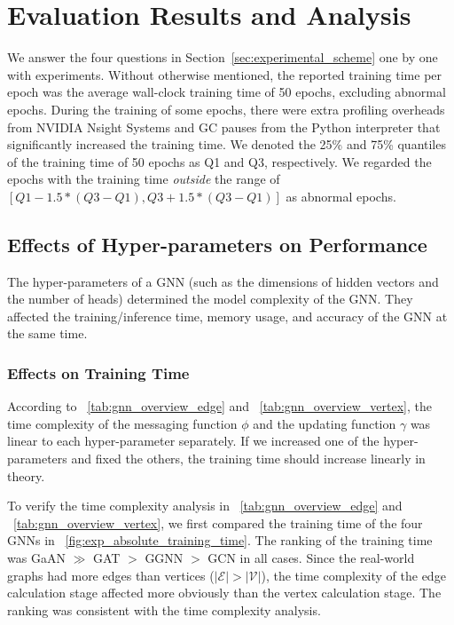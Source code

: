 \section{Evaluation Results and Analysis}
\label{sec:experiment_results}

We answer the four questions in Section~\ref{sec:experimental_scheme} one by one with experiments.
%
Without otherwise mentioned, the reported training time per epoch was the average wall-clock training time of 50 epochs, excluding abnormal epochs.
%
During the training of some epochs, there were extra profiling overheads from NVIDIA Nsight Systems and GC pauses from the Python interpreter that significantly increased the training time.
%
We denoted the 25\% and 75\% quantiles of the training time of 50 epochs as Q1 and Q3, respectively.
%
We regarded the epochs with the training time \emph{outside} the range of $[Q1 - 1.5 * (Q3-Q1), Q3 + 1.5 * (Q3-Q1)]$ as abnormal epochs.

\subsection{Effects of Hyper-parameters on Performance}
\label{sec:effects_of_hyper-parameters_on_performance}

The hyper-parameters of a GNN (such as the dimensions of hidden vectors and the number of heads) determined the model complexity of the GNN.
%
They affected the training/inference time, memory usage, and accuracy of the GNN at the same time.


\subsubsection{Effects on Training Time}

According to \tablename~\ref{tab:gnn_overview_edge} and \tablename~\ref{tab:gnn_overview_vertex}, the time complexity of the messaging function $\phi$ and the updating function $\gamma$ was linear to each hyper-parameter separately.
%
If we increased one of the hyper-parameters and fixed the others, the training time should increase linearly in theory.

To verify the time complexity analysis in \tablename~\ref{tab:gnn_overview_edge} and \tablename~\ref{tab:gnn_overview_vertex}, we first compared the {training} time of the four GNNs in \figurename~\ref{fig:exp_absolute_training_time}.
%
The ranking of the training time was GaAN $\gg$ GAT $>$ GGNN $>$ GCN in all cases.
%
Since the real-world graphs had more edges than vertices ($|\mathcal{E}| > |\mathcal{V}|$), the time complexity of the edge calculation stage affected more obviously than the vertex calculation stage.
%
The ranking was consistent with the time complexity analysis.

